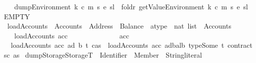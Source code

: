 \begin{isabellebody}
\ \ \ {\isachardoublequoteopen}dump\isactrlsub E\isactrlsub n\isactrlsub v\isactrlsub i\isactrlsub r\isactrlsub o\isactrlsub n\isactrlsub m\isactrlsub e\isactrlsub n\isactrlsub t\ k\ c\ m\ s\ e\ sl\ {\isacharequal}{\kern0pt}\ foldr\ {\isacharparenleft}{\kern0pt}getValue\isactrlsub E\isactrlsub n\isactrlsub v\isactrlsub i\isactrlsub r\isactrlsub o\isactrlsub n\isactrlsub m\isactrlsub e\isactrlsub n\isactrlsub t\ k\ c\ m\ s\ e{\isacharparenright}{\kern0pt}\ sl\ EMPTY{\isachardoublequoteclose}%
\isadelimdocument
%
\endisadelimdocument
%
\isatagdocument
%
\isamarkuptrue%
%
\endisatagdocument
{\isafolddocument}%
%
\isadelimdocument
%
\endisadelimdocument
{}\isamarkupfalse%
\ load\isactrlsub A\isactrlsub c\isactrlsub c\isactrlsub o\isactrlsub u\isactrlsub n\isactrlsub t\isactrlsub s\ {\isacharcolon}{\kern0pt}{\isacharcolon}{\kern0pt}\ {\isachardoublequoteopen}Accounts\ {\isasymRightarrow}\ {\isacharparenleft}{\kern0pt}Address\ {\isasymtimes}\ Balance\ {\isasymtimes}\ atype\ {\isasymtimes}\ nat{\isacharparenright}{\kern0pt}\ list\ {\isasymRightarrow}\ Accounts{\isachardoublequoteclose}\ \ \isanewline
\ \ \ {\isachardoublequoteopen}load\isactrlsub A\isactrlsub c\isactrlsub c\isactrlsub o\isactrlsub u\isactrlsub n\isactrlsub t\isactrlsub s\ acc\ {\isacharbrackleft}{\kern0pt}{\isacharbrackright}{\kern0pt}\ \ \ \ \ \ \ \ \ \ \ \ \ {\isacharequal}{\kern0pt}\ acc{\isachardoublequoteclose}\isanewline
\ {\isacharbar}{\kern0pt}\ {\isachardoublequoteopen}load\isactrlsub A\isactrlsub c\isactrlsub c\isactrlsub o\isactrlsub u\isactrlsub n\isactrlsub t\isactrlsub s\ acc\ {\isacharparenleft}{\kern0pt}{\isacharparenleft}{\kern0pt}ad{\isacharcomma}{\kern0pt}\ b{\isacharcomma}{\kern0pt}\ t{\isacharcomma}{\kern0pt}\ c{\isacharparenright}{\kern0pt}{\isacharhash}{\kern0pt}as{\isacharparenright}{\kern0pt}\ {\isacharequal}{\kern0pt}\ load\isactrlsub A\isactrlsub c\isactrlsub c\isactrlsub o\isactrlsub u\isactrlsub n\isactrlsub t\isactrlsub s\ {\isacharparenleft}{\kern0pt}acc\ {\isacharparenleft}{\kern0pt}ad{\isacharcolon}{\kern0pt}{\isacharequal}{\kern0pt}{\isasymlparr}bal{\isacharequal}{\kern0pt}b{\isacharcomma}{\kern0pt}\ type{\isacharequal}{\kern0pt}Some\ t{\isacharcomma}{\kern0pt}\ contracts{\isacharequal}{\kern0pt}c{\isasymrparr}{\isacharparenright}{\kern0pt}{\isacharparenright}{\kern0pt}\ as{\isachardoublequoteclose}\isanewline
\isanewline
{}\isamarkupfalse%
\ dumpStorage{\isacharcolon}{\kern0pt}{\isacharcolon}{\kern0pt}{\isachardoublequoteopen}StorageT\ {\isasymRightarrow}\ {\isacharparenleft}{\kern0pt}Identifier\ {\isasymtimes}\ Member{\isacharparenright}{\kern0pt}\ {\isasymRightarrow}\ String{\isachardot}{\kern0pt}literal{\isachardoublequoteclose}\ \isanewline

\end{isabellebody}
